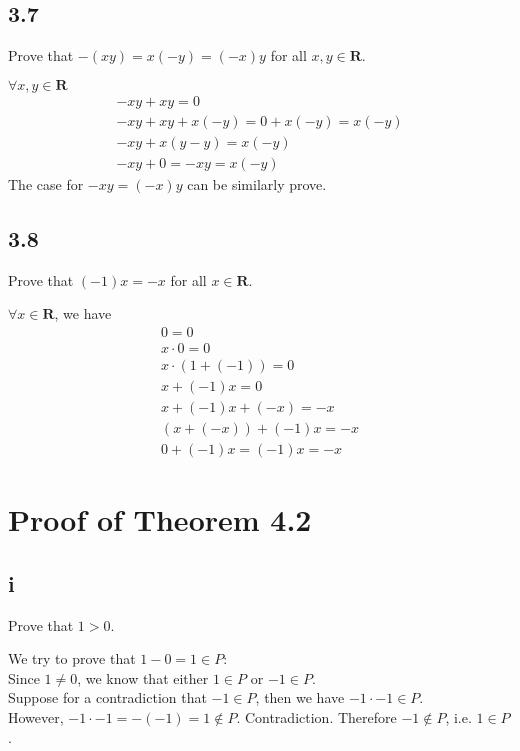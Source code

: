 \documentclass{article}
\begin{document}
\subsection*{3.7}
Prove that $-(xy) = x(-y) = (-x)y$ for all $x, y \in \mathbf{R}$.
\begin{addmargin}[1em]{0em}
    $\forall x, y \in \mathbf{R}$
    \begin{equation*}
        \begin{split}
            -xy + xy = 0\\
            -xy + xy + x(-y) = 0 + x(-y) = x(-y)\\
            -xy + x(y - y) = x(-y)\\
            -xy + 0 = -xy = x(-y)
        \end{split}
    \end{equation*}
    The case for $-xy = (-x)y$ can be similarly prove.
\end{addmargin}
\subsection*{3.8}
Prove that $(-1)x = -x$ for all $x \in \mathbf{R}$.
\begin{addmargin}[1em]{0em}
    $\forall x \in \mathbf{R}$, we have
    \begin{equation*}
        \begin{split}
            0 = 0\\
            x \cdot 0 = 0\\
            x \cdot (1 + (-1)) = 0\\
            x + (-1)x = 0\\
            x + (-1)x + (-x) = -x\\
            (x + (-x)) + (-1)x = -x\\
            0 + (-1)x = (-1)x = -x
        \end{split}
    \end{equation*}
\end{addmargin}
\section*{Proof of Theorem 4.2}
\subsection*{i}
Prove that $1 > 0$.
\begin{addmargin}[1em]{0em}
    We try to prove that $1 - 0 = 1 \in P$:\\
    Since $1 \neq 0$, we know that either $1 \in P$ or $-1 \in P$.\\
    Suppose for a contradiction that $-1 \in P$, then we have $-1 \cdot -1 \in P$.\\
    However, $-1 \cdot -1 = -(-1) = 1 \notin P$. Contradiction. Therefore $-1 \notin P$, i.e. $1 \in P$.
\end{addmargin}
\end{document}
